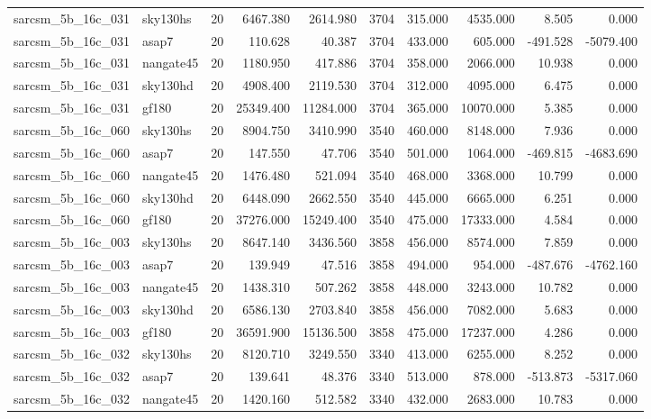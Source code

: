 \begin{longtable}{llrrrrrrrr}
sarcsm\_5b\_16c\_031 & sky130hs & 20 & 6467.380 & 2614.980 & 3704 & 315.000 & 4535.000 & 8.505 & 0.000 \\
sarcsm\_5b\_16c\_031 & asap7 & 20 & 110.628 & 40.387 & 3704 & 433.000 & 605.000 & -491.528 & -5079.400 \\
sarcsm\_5b\_16c\_031 & nangate45 & 20 & 1180.950 & 417.886 & 3704 & 358.000 & 2066.000 & 10.938 & 0.000 \\
sarcsm\_5b\_16c\_031 & sky130hd & 20 & 4908.400 & 2119.530 & 3704 & 312.000 & 4095.000 & 6.475 & 0.000 \\
sarcsm\_5b\_16c\_031 & gf180 & 20 & 25349.400 & 11284.000 & 3704 & 365.000 & 10070.000 & 5.385 & 0.000 \\
sarcsm\_5b\_16c\_060 & sky130hs & 20 & 8904.750 & 3410.990 & 3540 & 460.000 & 8148.000 & 7.936 & 0.000 \\
sarcsm\_5b\_16c\_060 & asap7 & 20 & 147.550 & 47.706 & 3540 & 501.000 & 1064.000 & -469.815 & -4683.690 \\
sarcsm\_5b\_16c\_060 & nangate45 & 20 & 1476.480 & 521.094 & 3540 & 468.000 & 3368.000 & 10.799 & 0.000 \\
sarcsm\_5b\_16c\_060 & sky130hd & 20 & 6448.090 & 2662.550 & 3540 & 445.000 & 6665.000 & 6.251 & 0.000 \\
sarcsm\_5b\_16c\_060 & gf180 & 20 & 37276.000 & 15249.400 & 3540 & 475.000 & 17333.000 & 4.584 & 0.000 \\
sarcsm\_5b\_16c\_003 & sky130hs & 20 & 8647.140 & 3436.560 & 3858 & 456.000 & 8574.000 & 7.859 & 0.000 \\
sarcsm\_5b\_16c\_003 & asap7 & 20 & 139.949 & 47.516 & 3858 & 494.000 & 954.000 & -487.676 & -4762.160 \\
sarcsm\_5b\_16c\_003 & nangate45 & 20 & 1438.310 & 507.262 & 3858 & 448.000 & 3243.000 & 10.782 & 0.000 \\
sarcsm\_5b\_16c\_003 & sky130hd & 20 & 6586.130 & 2703.840 & 3858 & 456.000 & 7082.000 & 5.683 & 0.000 \\
sarcsm\_5b\_16c\_003 & gf180 & 20 & 36591.900 & 15136.500 & 3858 & 475.000 & 17237.000 & 4.286 & 0.000 \\
sarcsm\_5b\_16c\_032 & sky130hs & 20 & 8120.710 & 3249.550 & 3340 & 413.000 & 6255.000 & 8.252 & 0.000 \\
sarcsm\_5b\_16c\_032 & asap7 & 20 & 139.641 & 48.376 & 3340 & 513.000 & 878.000 & -513.873 & -5317.060 \\
sarcsm\_5b\_16c\_032 & nangate45 & 20 & 1420.160 & 512.582 & 3340 & 432.000 & 2683.000 & 10.783 & 0.000 \\

\end{longtable}
